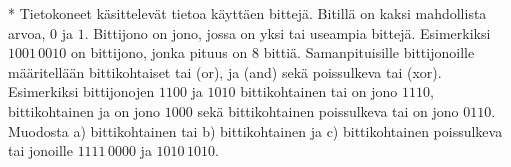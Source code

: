 \begin{tehtava}
     * Tietokoneet käsittelevät tietoa käyttäen bittejä. Bitillä on kaksi mahdollista arvoa, $0$ ja $1$.
Bittijono on jono, jossa on yksi tai useampia bittejä. Esimerkiksi $1001\, 0010$ on bittijono, jonka pituus on $8$ bittiä. Samanpituisille bittijonoille määritellään bittikohtaiset tai (or), ja (and) sekä poissulkeva tai (xor). Esimerkiksi bittijonojen $1100$ ja $1010$ bittikohtainen tai on jono $1110$, bittikohtainen ja on jono $1000$ sekä bittikohtainen poissulkeva tai on jono $0110$. Muodosta a) bittikohtainen tai  b) bittikohtainen ja c) bittikohtainen poissulkeva tai jonoille $1111\, 0000$ ja $1010\, 1010$.
    \begin{alakohdat}
    \end{alakohdat}

    \begin{vastaus}
    
        \begin{alakohdat}
        \end{alakohdat}
    \end{vastaus}
    
\end{tehtava}

